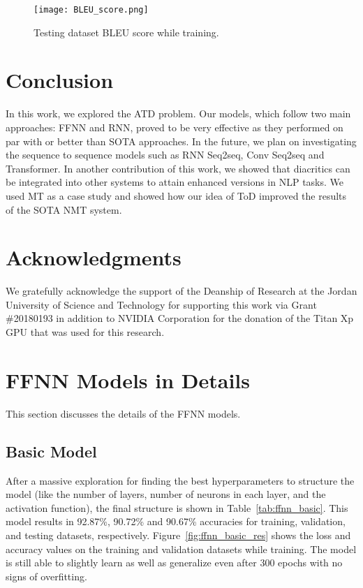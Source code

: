 \documentclass[11pt,a4paper]{article}
\begin{document}
\begin{figure}[h]
    \centering
    \texttt{[image: BLEU\_score.png]}
    \caption{Testing dataset BLEU score while training.}
    \label{fig:bleu_scores}
\end{figure}

\section{Conclusion}
\label{sec:conc}
In this work, we explored the ATD problem. Our models, which follow two main approaches: FFNN and RNN, proved to be very effective as they performed on par with or better than SOTA approaches.
In the future, we plan on investigating the sequence to sequence models such as RNN Seq2seq, Conv Seq2seq and Transformer. In another contribution of this work, we showed that diacritics can be integrated into other systems to attain enhanced versions in NLP tasks. We used MT as a case study and showed how our idea of ToD improved the results of the SOTA NMT system.

\section*{Acknowledgments}
We gratefully acknowledge the support of the Deanship of Research at the Jordan University of Science and Technology for supporting this work via Grant \#20180193 in addition to NVIDIA Corporation for the donation of the Titan Xp GPU that was used for this research.




\clearpage

\appendix

\section{FFNN Models in Details}
\label{app:a}

This section discusses the details of the FFNN models.

\subsection{Basic Model}

After a massive exploration for finding the best hyperparameters to structure the model (like the number of layers, number of neurons in each layer, and the activation function), the final structure is shown in Table~\ref{tab:ffnn_basic}. This model results in 92.87\%, 90.72\% and 90.67\% accuracies for training, validation, and testing datasets, respectively. Figure~\ref{fig:ffnn_basic_res} shows the loss and accuracy values on the training and validation datasets while training. The model is still able to slightly learn as well as generalize even after 300 epochs with no signs of overfitting.
\end{document}
